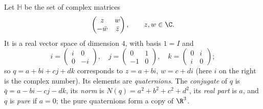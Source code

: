 \begin{definition}
Let $\mathbb H$ be the set of complex matrices
\[
\begin{pmatrix}z&w\\-\bar w&\bar z\end{pmatrix},\qquad z,w\in\C.
\]
It is a real vector space of dimension $4$, with basis $1=I$ and
\[
i=\begin{pmatrix}i&0\\0&-i\end{pmatrix},\quad j=\begin{pmatrix}0&1\\-1&0\end{pmatrix},\quad k=\begin{pmatrix}0&i\\i&0\end{pmatrix};
\]
so $q=a+bi+cj+dk$ corresponds to $z=a+bi$, $w=c+di$ (here $i$ on the right is the complex number). Its elements are \emph{quaternions}. The \emph{conjugate} of $q$ is $\bar q=a-bi-cj-dk$, its \emph{norm} is $N(q)=a^2+b^2+c^2+d^2$, its \emph{real part} is $a$, and $q$ is \emph{pure} if $a=0$; the pure quaternions form a copy of $\R^3$.
\end{definition}

